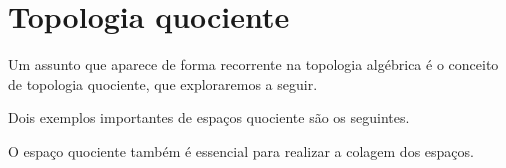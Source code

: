 \section{Topologia quociente}
\label{topologia-quociente}
Um assunto que aparece de forma recorrente na topologia algébrica é o conceito de topologia quociente, que exploraremos a seguir. 

Dois exemplos importantes de espaços quociente são os seguintes.


O espaço quociente também é essencial para realizar a colagem dos espaços.




